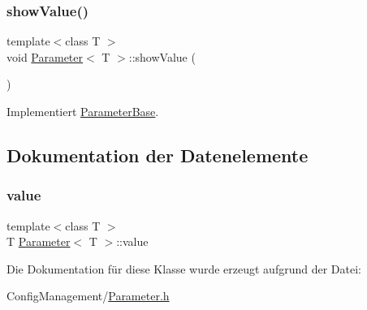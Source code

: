 \hypertarget{class_parameter_ab0091864db90216ee76ee9084422b380}{}\label{class_parameter_ab0091864db90216ee76ee9084422b380} 
\subsubsection{\texorpdfstring{show\+Value()}{showValue()}}
{\footnotesize\ttfamily template$<$class T $>$ \\
void \hyperlink{class_parameter}{Parameter}$<$ T $>$\+::show\+Value (\begin{DoxyParamCaption}{ }\end{DoxyParamCaption})\hspace{0.3cm}{\ttfamily [virtual]}}



Implementiert \hyperlink{class_parameter_base_ad09b4d79a05987d903a7d97e16649df7}{Parameter\+Base}.



\subsection{Dokumentation der Datenelemente}
\hypertarget{class_parameter_a5dcbb3f478f204d7931eec2b3ed66117}{}\label{class_parameter_a5dcbb3f478f204d7931eec2b3ed66117} 
\subsubsection{\texorpdfstring{value}{value}}
{\footnotesize\ttfamily template$<$class T $>$ \\
T \hyperlink{class_parameter}{Parameter}$<$ T $>$\+::value}



Die Dokumentation für diese Klasse wurde erzeugt aufgrund der Datei\+:\begin{DoxyCompactItemize}
\item 
Config\+Management/\hyperlink{_parameter_8h}{Parameter.\+h}\end{DoxyCompactItemize}
